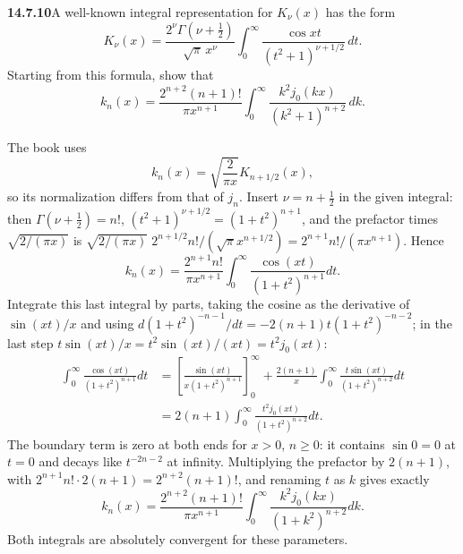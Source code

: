 \par\bigskip
\noindent\textbf{14.7.10}\quad A well-known integral representation for
$K_{\nu}(x)$ has the form
\[
K_{\nu}(x)=\frac{2^{\nu}\Gamma(\nu+\frac{1}{2})}{\sqrt{\pi}\,x^{\nu}}
\int_{0}^{\infty}\frac{\cos xt}{(t^{2}+1)^{\nu+1/2}}\,dt.
\]
Starting from this formula, show that
\[
k_{n}(x)=\frac{2^{n+2}(n+1)!}{\pi x^{n+1}}
\int_{0}^{\infty}\frac{k^{2}j_{0}(kx)}{(k^{2}+1)^{n+2}}\,dk.
\]
\par{}
\solution
The book uses
\[
k_n(x)=\sqrt{\frac{2}{\pi x}}K_{n+1/2}(x),
\]
so its normalization differs from that of $j_n$. Insert
$\nu=n+\tfrac12$ in the given integral: then $\Gamma(\nu+\frac12)=n!$,
$(t^2+1)^{\nu+1/2}=(1+t^2)^{n+1}$, and the prefactor times
$\sqrt{2/(\pi x)}$ is
$\sqrt{2/(\pi x)}\;2^{n+1/2}n!/(\sqrt\pi x^{n+1/2})
=2^{n+1}n!/(\pi x^{n+1})$. Hence
\[
k_n(x)=\frac{2^{n+1}n!}{\pi x^{n+1}}
\int_0^\infty\frac{\cos(xt)}{(1+t^2)^{n+1}}dt.
\]
Integrate this last integral by parts, taking the cosine as the
derivative of $\sin(xt)/x$ and using
$d(1+t^2)^{-n-1}/dt=-2(n+1)t(1+t^2)^{-n-2}$; in the last step
$t\sin(xt)/x=t^2\sin(xt)/(xt)=t^2j_0(xt)$:
\begin{align*}
\int_0^\infty\frac{\cos(xt)}{(1+t^2)^{n+1}}dt
&=\left[\frac{\sin(xt)}{x(1+t^2)^{n+1}}\right]_0^\infty
+\frac{2(n+1)}x\int_0^\infty
\frac{t\sin(xt)}{(1+t^2)^{n+2}}dt\\
&=2(n+1)\int_0^\infty
\frac{t^2j_0(xt)}{(1+t^2)^{n+2}}dt.
\end{align*}
The boundary term is zero at both ends for $x>0$, $n\ge0$: it
contains $\sin0=0$ at $t=0$ and decays like $t^{-2n-2}$ at
infinity. Multiplying the prefactor by $2(n+1)$, with
$2^{n+1}n!\cdot2(n+1)=2^{n+2}(n+1)!$, and renaming $t$ as $k$
gives exactly
\[
\boxed{k_n(x)=\frac{2^{n+2}(n+1)!}{\pi x^{n+1}}
\int_0^\infty\frac{k^2j_0(kx)}{(1+k^2)^{n+2}}dk.}
\]
Both integrals are absolutely convergent for these parameters.

